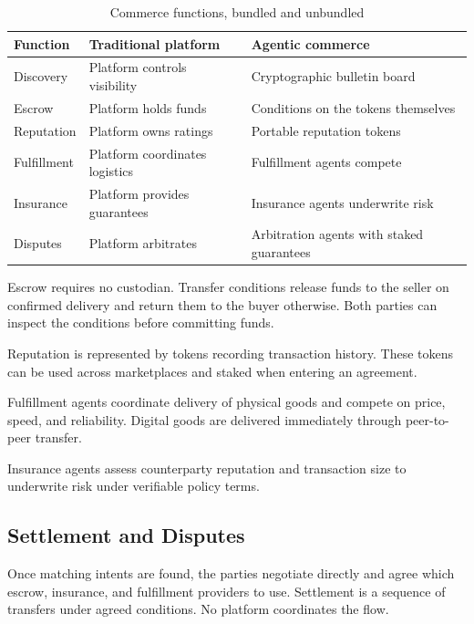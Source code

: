 \begin{table}[h]
    \centering
    \caption{Commerce functions, bundled and unbundled}
    \label{tab:commerce}
    \begin{tabular}{p{2.5cm}p{5cm}p{5cm}}
        \toprule
        \textbf{Function} & \textbf{Traditional platform} & \textbf{Agentic commerce} \\
        \midrule
        Discovery & Platform controls visibility & Cryptographic bulletin board \\
        \addlinespace
        Escrow & Platform holds funds & Conditions on the tokens themselves \\
        \addlinespace
        Reputation & Platform owns ratings & Portable reputation tokens \\
        \addlinespace
        Fulfillment & Platform coordinates logistics & Fulfillment agents compete \\
        \addlinespace
        Insurance & Platform provides guarantees & Insurance agents underwrite risk \\
        \addlinespace
        Disputes & Platform arbitrates & Arbitration agents with staked guarantees \\
        \bottomrule
    \end{tabular}
\end{table}

Escrow requires no custodian. Transfer conditions release funds to the seller on confirmed delivery and return them to the buyer otherwise. Both parties can inspect the conditions before committing funds.

Reputation is represented by tokens recording transaction history. These tokens can be used across marketplaces and staked when entering an agreement.

Fulfillment agents coordinate delivery of physical goods and compete on price, speed, and reliability. Digital goods are delivered immediately through peer-to-peer transfer.

Insurance agents assess counterparty reputation and transaction size to underwrite risk under verifiable policy terms.

\subsection{Settlement and Disputes}

Once matching intents are found, the parties negotiate directly and agree which escrow, insurance, and fulfillment providers to use. Settlement is a sequence of transfers under agreed conditions. No platform coordinates the flow.

